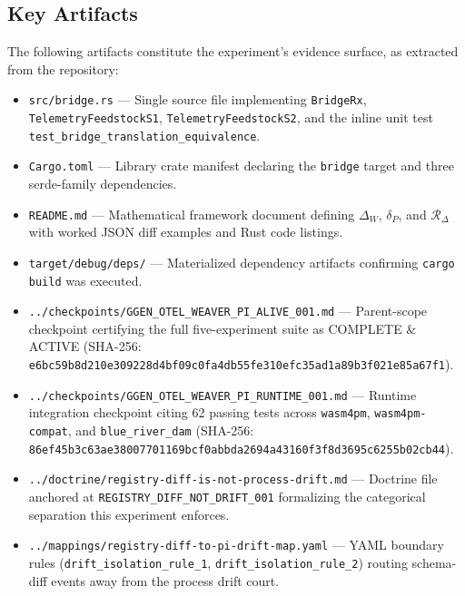 \subsection{Key Artifacts}
\label{sec:otel-weaver-exp-002-diff-to-residual-identity-artifacts}

The following artifacts constitute the experiment's evidence surface, as extracted
from the repository:

\begin{itemize}
    \item \texttt{src/bridge.rs} --- Single source file implementing \texttt{BridgeRx},
          \texttt{TelemetryFeedstockS1}, \texttt{TelemetryFeedstockS2}, and the inline
          unit test \texttt{test\_bridge\_translation\_equivalence}.
    \item \texttt{Cargo.toml} --- Library crate manifest declaring the \texttt{bridge}
          target and three serde-family dependencies.
    \item \texttt{README.md} --- Mathematical framework document defining
          $\Delta_W$, $\delta_P$, and $\mathcal{R}_{\Delta}$ with worked JSON diff
          examples and Rust code listings.
    \item \texttt{target/debug/deps/} --- Materialized dependency artifacts confirming
          \texttt{cargo build} was executed.
    \item \texttt{../checkpoints/GGEN\_OTEL\_WEAVER\_PI\_ALIVE\_001.md} --- Parent-scope
          checkpoint certifying the full five-experiment suite as COMPLETE \& ACTIVE
          (SHA-256: \texttt{e6bc59b8d210e309228d4bf09c0fa4db55fe310efc35ad1a89b3f021e85a67f1}).
    \item \texttt{../checkpoints/GGEN\_OTEL\_WEAVER\_PI\_RUNTIME\_001.md} --- Runtime
          integration checkpoint citing 62 passing tests across \texttt{wasm4pm},
          \texttt{wasm4pm-compat}, and \texttt{blue\_river\_dam}
          (SHA-256: \texttt{86ef45b3c63ae38007701169bcf0abbda2694a43160f3f8d3695c6255b02cb44}).
    \item \texttt{../doctrine/registry-diff-is-not-process-drift.md} --- Doctrine file
          anchored at \texttt{REGISTRY\_DIFF\_NOT\_DRIFT\_001} formalizing the categorical
          separation this experiment enforces.
    \item \texttt{../mappings/registry-diff-to-pi-drift-map.yaml} --- YAML boundary rules
          (\texttt{drift\_isolation\_rule\_1}, \texttt{drift\_isolation\_rule\_2}) routing
          schema-diff events away from the process drift court.
\end{itemize}
